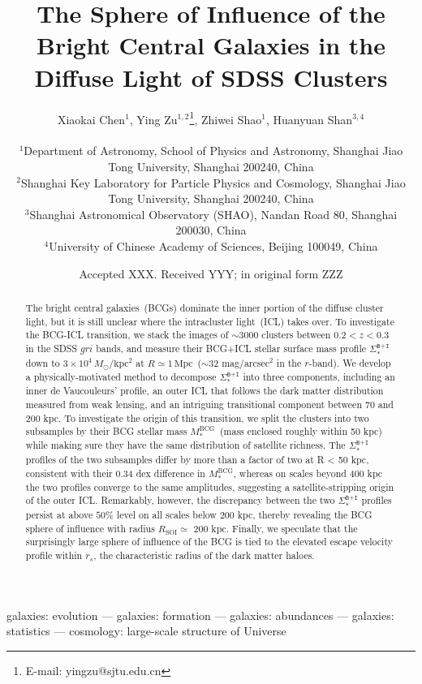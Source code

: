 \documentclass[fleqn,usenatbib]{mnras}
\title[Decomposition of the Diffuse Cluster Light]{The Sphere of
Influence of the Bright Central Galaxies in the Diffuse Light of SDSS
Clusters}
\author[Chen 2021]
{Xiaokai Chen$^{1}$,
Ying  Zu$^{1, 2}$\thanks{E-mail: yingzu@sjtu.edu.cn},
Zhiwei Shao$^{1}$,
Huanyuan Shan$^{3, 4}$
\\ \\
$^{1}$Department of Astronomy, School of Physics and Astronomy, Shanghai Jiao Tong
University, Shanghai 200240, China\\
$^{2}$Shanghai Key Laboratory for Particle Physics and Cosmology, Shanghai Jiao Tong
University, Shanghai 200240, China\\
$^{3}$Shanghai Astronomical Observatory (SHAO), Nandan Road 80, Shanghai 200030, China \\
$^{4}$University of Chinese Academy of Sciences, Beijing 100049, China
}
\date{Accepted XXX. Received YYY; in original form ZZZ}
\begin{document}
\label{firstpage}
\pagerange{\pageref{firstpage}--\pageref{lastpage}}
\maketitle

\begin{abstract}
    The bright central galaxies~(BCGs) dominate the inner portion of the
    diffuse cluster light, but it is still unclear where the intracluster
    light~(ICL) takes over. To investigate the BCG-ICL transition, we stack
    the images of ${\sim}3000$ clusters between $0.2{<}z{<}0.3$ in the SDSS
    $gri$ bands, and measure their BCG+ICL stellar surface mass profile
    $\Sigma_{*}^{\texttt{B+I}}$ down to
    $3{\times}10^4\,M_{\odot}/\mathrm{kpc}^{2}$ at
    $R{\simeq}1\,\mathrm{Mpc}$~(${\sim}32$ mag/arcsec$^2$ in the $r$-band).
    We develop a physically-motivated method to decompose
    $\Sigma_{*}^{\texttt{B+I}}$ into three components, including an inner de
    Vaucouleurs' profile, an outer ICL that follows the dark matter
    distribution measured from weak lensing, and an intriguing transitional
    component between 70 and 200 kpc. To investigate the origin of this
    transition, we split the clusters into two subsamples by their BCG
    stellar mass $M_*^{\mathrm{BCG}}$~(mass enclosed roughly within 50 kpc)
    while making sure they have the same distribution of satellite
    richness. The $\Sigma_{*}^{\texttt{B+I}}$ profiles of the two subsamples
    differ by more than a factor of two at R < 50 kpc, consistent with
    their 0.34 dex difference in $M_*^{\mathrm{BCG}}$, whereas on scales
    beyond 400 kpc the two profiles converge to the same amplitudes,
    suggesting a satellite-stripping origin of the outer ICL.  Remarkably,
    however, the discrepancy between the two $\Sigma_{*}^{\texttt{B+I}}$
    profiles persist at above $50\%$ level on all scales below 200 kpc, thereby revealing
    the BCG sphere of influence with radius $R_{\mathrm{SOI}}{\simeq}$ 200
    kpc. Finally, we speculate that the surprisingly large sphere of
    influence of the BCG is tied to the elevated escape velocity profile
    within $r_s$, the characteristic radius of the dark matter haloes.
\end{abstract}
\begin{keywords} galaxies: evolution --- galaxies: formation --- galaxies: abundances ---
galaxies: statistics --- cosmology: large-scale structure of Universe \end{keywords}
\end{document}
